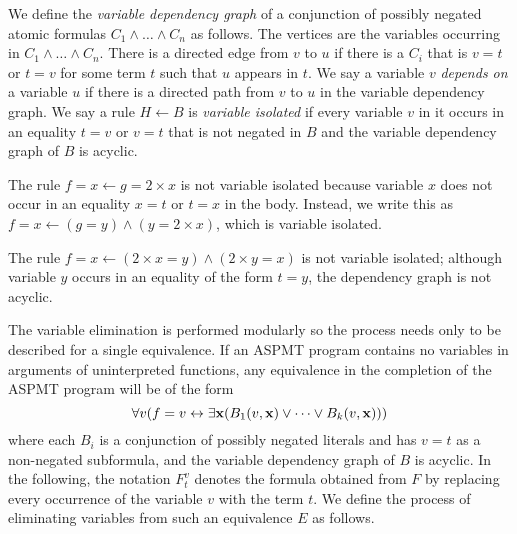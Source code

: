 \documentclass[runningheads]{llncs}
\def\ar{\leftarrow}
\def\ar{\leftarrow}
\newcommand{\cbla}{\color{black}}
\begin{document}

We define the {\em variable dependency graph} of a conjunction of
possibly negated atomic formulas $C_1 \land \dots \land C_n$ as
follows. The vertices are the variables occurring in $C_1
\land \dots \land C_n$. There is a directed edge from $v$ to $u$ if
there is a $C_i$ that is $v = t$ or $t = v$ for some term $t$ such that $u$
appears in $t$. 
We say a variable $v$ {\em depends on} a variable $u$ if
there is a directed path from $v$ to $u$ in the variable dependency
graph. 
We say a rule $H \ar B$ is  {\em variable isolated} if every
variable $v$ in it occurs in an equality $t = v$ or $v = t$ that is
not negated in $B$ and the variable dependency graph of $B$ is acyclic.

\begin{example}
The rule $f = x \ar g = 2\times x$ is not variable isolated because variable
$x$ does not occur in an equality $x = t$ or $t = x$ in the
body. Instead, we write this as $f = x \leftarrow (g = y)\land (y =
2\times x)$, which is variable isolated.

The rule $f = x \ar (2\times x = y)\land (2\times y = x)$ is not variable isolated;
although variable $y$ occurs in an equality of the form $t = y$, the
dependency graph is not acyclic. %
\end{example}
\cbla

The variable elimination is performed modularly so the process needs 
only to be described for a single equivalence. If an ASPMT program
contains no variables in arguments of uninterpreted functions, any
equivalence in the completion of the ASPMT program will be
of the form 
$$\forall v(f = v \leftrightarrow \exists {\bf x} (B_1(v,{\bf x}) \lor \dots \lor B_k(v,{\bf x})))$$
where each $B_i$ is a conjunction of possibly negated literals and has
$v = t$ as a non-negated subformula, and the variable
dependency graph of $B$ is acyclic. %
In the following, the notation $F^v_t$ denotes the formula
obtained from $F$ by replacing every occurrence of the variable $v$
with the term $t$. We define the process of eliminating variables from
such an equivalence $E$ as follows.
\end{document}
